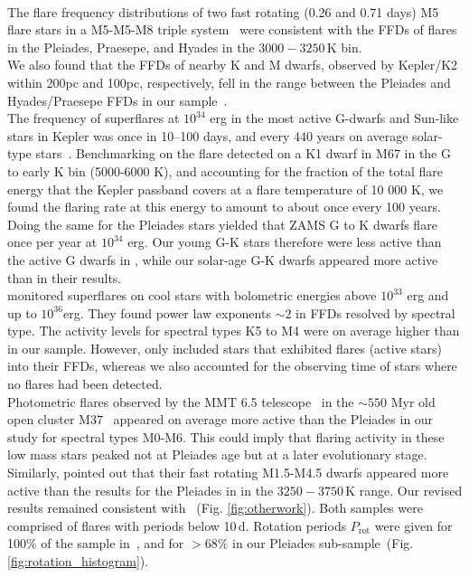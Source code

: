\documentclass{aa}
\begin{document}
\\
The flare frequency distributions of two fast rotating (0.26 and 0.71 days) M5 flare stars in a M5-M5-M8 triple system~\citep{lurie2015} were consistent with the FFDs of flares in the Pleiades, Praesepe, and Hyades in the $3000-3250\,$K bin. 
\\
We also found that the FFDs of nearby K and M dwarfs, observed by Kepler/K2 within 200pc and 100pc, respectively, fell in the range between the Pleiades and Hyades/Praesepe FFDs in our sample~\citep{lin2019}.
\\
The frequency of superflares at $10^{34}$ erg in the most active G-dwarfs and Sun-like stars in Kepler was once in 10–100 days, and every 440 years on average solar-type stars~\citep{shibayama2013}. Benchmarking on the flare detected on a K1 dwarf in M67 in the G to early K bin (5000-6000 K), and accounting for the fraction of the total flare energy that the Kepler passband covers at a flare temperature of 10 000 K, we found the flaring rate at this energy to amount to about once every 100 years. Doing the same for the Pleiades stars yielded that ZAMS G to K dwarfs flare once per year at $10^{34}$ erg. Our young G-K stars therefore were less active than the active G dwarfs in \citet{shibayama2013}, while our solar-age G-K dwarfs appeared more active than in their results.
\\
\citet{howard2019} monitored superflares on cool stars with bolometric energies above $10^{33}$ erg and up to $10^{36}$erg. They found power law exponents $\sim 2$ in FFDs resolved by spectral type. The activity levels for spectral types K5 to M4 were on average higher than in our sample. However, \citet{howard2019} only included stars that exhibited flares (active stars) into their FFDs, whereas we also accounted for the observing time of stars where no flares had been detected.
\\
Photometric flares observed by the MMT 6.5 telescope~\citep{hartman2008} in the $\sim550$ Myr old open cluster M37~\citep{chang2015} appeared on average more active than the Pleiades in our study for spectral types M0-M6. This could imply that flaring activity in these low mass stars peaked not at Pleiades age but at a later evolutionary stage. 
\\
Similarly, \citet{raetz2020} pointed out that their fast rotating M1.5-M4.5 dwarfs appeared more active than the results for the Pleiades in  in the $3250-3750\,$K range. Our revised results remained consistent with ~(Fig. \ref{fig:otherwork}). Both samples were comprised of flares with periods below 10\,d. Rotation periods $P_\mathrm{rot}$ were given for 100\% of the sample in~\cite{raetz2020}, and for \mbox{$>68\%$} in our Pleiades sub-sample~(Fig. \ref{fig:rotation_histogram}). 
\end{document}
